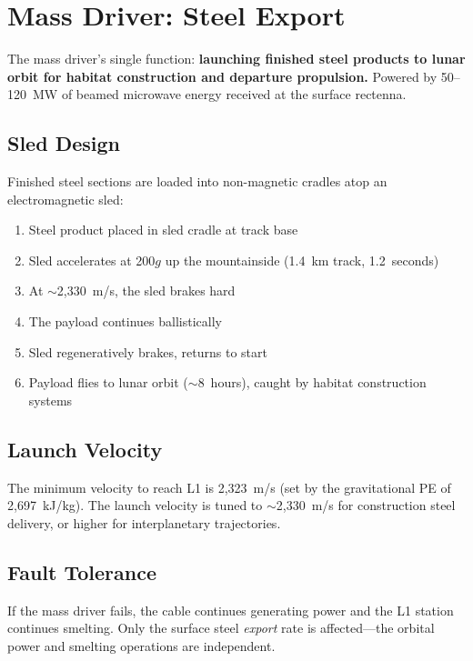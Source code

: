 \section{Mass Driver: Steel Export}

The mass driver's single function: \textbf{launching finished steel products to lunar orbit for habitat construction and departure propulsion.} Powered by 50--120~MW of beamed microwave energy received at the surface rectenna.

\subsection{Sled Design}

Finished steel sections are loaded into non-magnetic cradles atop an electromagnetic sled:

\begin{enumerate}[label=(\roman*)]
\item Steel product placed in sled cradle at track base
\item Sled accelerates at 200$g$ up the mountainside (1.4~km track, 1.2~seconds)
\item At $\sim$2,330~m/s, the sled brakes hard
\item The payload continues ballistically
\item Sled regeneratively brakes, returns to start
\item Payload flies to lunar orbit (${\sim}$8~hours), caught by habitat construction systems
\end{enumerate}

\subsection{Launch Velocity}

The minimum velocity to reach L1 is 2,323~m/s (set by the gravitational PE of 2,697~kJ/kg). The launch velocity is tuned to ${\sim}$2,330~m/s for construction steel delivery, or higher for interplanetary trajectories.

\subsection{Fault Tolerance}

If the mass driver fails, the cable continues generating power and the L1 station continues smelting. Only the surface steel \emph{export} rate is affected---the orbital power and smelting operations are independent.